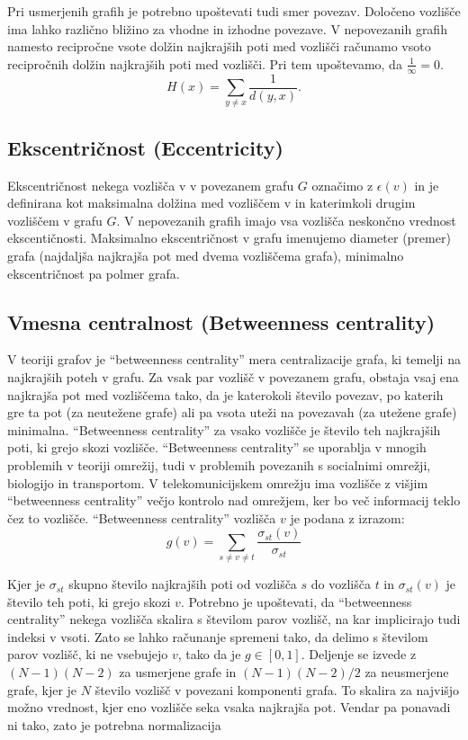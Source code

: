\documentclass[12pt,a4paper]{amsart}
\begin{document}
Pri usmerjenih grafih je potrebno upoštevati tudi smer povezav. Določeno vozlišče ima lahko različno bližino za vhodne in izhodne povezave.
V nepovezanih grafih namesto recipročne vsote dolžin najkrajših poti med vozlišči računamo vsoto recipročnih dolžin najkrajših poti med vozlišči. Pri tem upoštevamo, da $\frac{1}{\infty} = 0.$
$$H(x) = \sum_{y \ne x}^{} \frac{1}{d(y, x)}.$$


\subsection{Ekscentričnost (Eccentricity)}
Ekscentričnost nekega vozlišča v  v povezanem grafu $G$ označimo z $\epsilon(v)$ in je definirana kot maksimalna dolžina med vozliščem v in katerimkoli drugim vozliščem v grafu $G$. V nepovezanih grafih imajo vsa vozlišča neskončno vrednost ekscentičnosti.
Maksimalno ekscentričnost v grafu imenujemo diameter (premer) grafa (najdaljša najkrajša pot med dvema vozliščema grafa), minimalno ekscentričnost pa polmer grafa.


\subsection{Vmesna centralnost (Betweenness centrality)}

V teoriji grafov je “betweenness centrality” mera centralizacije grafa, ki temelji na najkrajših poteh v grafu. Za vsak par vozlišč v povezanem grafu, obstaja vsaj ena najkrajša pot med vozliščema tako, da je katerokoli število povezav, po katerih gre ta pot (za neutežene grafe) ali pa vsota uteži na povezavah (za utežene grafe) minimalna. “Betweenness centrality” za vsako vozlišče je število teh najkrajših poti, ki grejo skozi vozlišče. “Betweenness centrality” se uporablja v mnogih problemih v teoriji omrežij, tudi v problemih povezanih s socialnimi omrežji, biologijo in transportom. V telekomunicijskem omrežju ima vozlišče z višjim “betweenness centrality” večjo kontrolo nad omrežjem, ker bo več informacij teklo čez to vozlišče. “Betweenness centrality” vozlišča $v$ je podana z izrazom:
$$g(v) = \sum_{s \ne v \ne t}^{ } \frac{\sigma_{st} (v)}{\sigma_{st}}$$

Kjer je $\sigma_{st}$ skupno število najkrajših poti od vozlišča $s$ do vozlišča $t$ in $\sigma_{st} (v)$ je število teh poti, ki grejo skozi $v$. Potrebno je upoštevati, da “betweenness centrality” nekega vozlišča skalira s številom parov vozlišč, na kar implicirajo tudi indeksi v vsoti. Zato se lahko računanje spremeni tako, da delimo s številom parov vozlišč, ki ne vsebujejo $v$, tako da je $g \in [0, 1]$.  Deljenje se izvede z $(N - 1)(N - 2)$ za usmerjene grafe in $(N - 1)(N - 2)/2$ za neusmerjene grafe, kjer je $N$ število vozlišč v povezani komponenti grafa. To skalira za najvišjo možno vrednost, kjer eno vozlišče seka vsaka najkrajša pot. Vendar pa ponavadi ni tako, zato je potrebna normalizacija 
\end{document}
